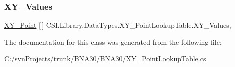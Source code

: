 \subsubsection{\texorpdfstring{XY\_Values}{XY\_Values}}
{\footnotesize\ttfamily \mbox{\hyperlink{struct_c_s_i_1_1_library_1_1_data_types_1_1_x_y___point}{X\+Y\+\_\+\+Point}} \mbox{[}$\,$\mbox{]} C\+S\+I.\+Library.\+Data\+Types.\+X\+Y\+\_\+\+Point\+Lookup\+Table.\+X\+Y\+\_\+\+Values\hspace{0.3cm}{\ttfamily [get]}, {\ttfamily [set]}}







The documentation for this class was generated from the following file\+:\begin{DoxyCompactItemize}
\item 
C\+:/svn\+Projects/trunk/\+B\+N\+A30/\+B\+N\+A30/X\+Y\+\_\+\+Point\+Lookup\+Table.\+cs\end{DoxyCompactItemize}
